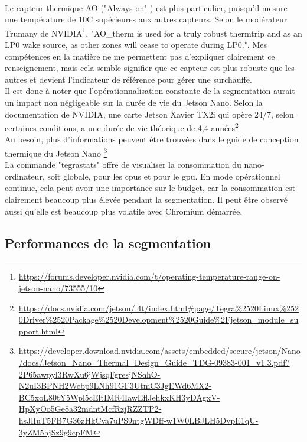 \vspace{0.5\baselineskip}
\\
\noindent Le capteur thermique AO ("Always on" ) est plus particulier, puisqu'il mesure une température de 10C supérieures aux autres capteurs. Selon le modérateur Trumany de NVIDIA\footnote{\url{https://forums.developer.nvidia.com/t/operating-temperature-range-on-jetson-nano/73555/10}}, "AO\_therm is used for a truly robust thermtrip and as an LP0 wake source, as other zones will cease to operate during LP0.". Mes compétences en la matière ne me permettent pas d'expliquer clairement ce renseignement, mais cela semble signifier que ce capteur est plus robuste que les autres et devient l'indicateur de référence pour gérer une surchauffe. 
\vspace{0.5\baselineskip}
\\
\noindent Il est donc à noter que l'opérationnalisation constante de la segmentation aurait un impact non négligeable sur la durée de vie du Jetson Nano. Selon la documentation de NVIDIA, une carte Jetson Xavier TX2i qui opère 24/7, selon certaines conditions, a une durée de vie théorique de 4,4 années\footnote{\url{https://docs.nvidia.com/jetson/l4t/index.html#page/Tegra\%2520Linux\%2520Driver\%2520Package\%2520Development\%2520Guide\%2Fjetson_module_support.html}}
\vspace{0.5\baselineskip}
\\
\noindent Au besoin, plus d'informations peuvent être trouvées dans le guide de conception thermique du Jetson Nano \footnote{\url{https://developer.download.nvidia.com/assets/embedded/secure/jetson/Nano/docs/Jetson_Nano_Thermal_Design_Guide_TDG-09383-001_v1.3.pdf?2P65awpyl3RwXu6jWjsqFgresjNSqhO-N2uI3BPNH2Wcbp9LNh91GF3UtmC3JgEWd6MX2-BC5xoL80tY5Wpl5cEltIMR4IawEflJehkxKH3yDAgxV-HpXyOo5Ge8a32mdntMcfRzjRZZTP2-hsJlIuT5FB7G36zHkCva7uPS9ntgWDff-w1W0LBJLH5DvpE1qU-3yZM5hjSz9g9cpFM}}
\vspace{0.5\baselineskip}
\\
\noindent La commande "tegrastats" offre de visualiser la consommation du nano-ordinateur, soit globale, pour les \acrshort{cpu}s et pour le \acrshort{gpu}. En mode opérationnel continue, cela peut avoir une importance sur le budget, car la consommation est clairement beaucoup plus élevée pendant la segmentation. Il peut être observé aussi qu'elle est beaucoup plus volatile avec Chromium démarrée. 
\subsection{Performances de la segmentation}
